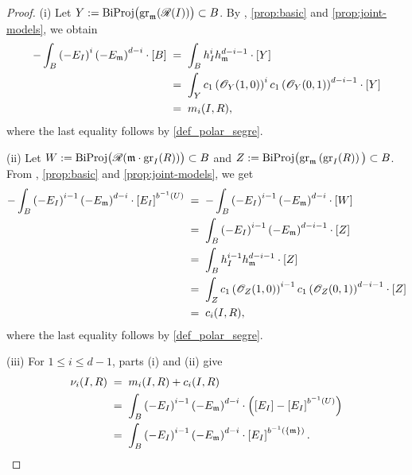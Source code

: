\documentclass[a4paper, 11pt]{amsart}
\newcommand{\mm}{{\normalfont\mathfrak{m}}}
\newcommand{\Rees}{\mathscr{R}}
\newcommand{\OO}{\mathscr{O}}
\newcommand{\gr}{{\normalfont\text{gr}}}
\newcommand{\biProj}{{\normalfont\text{BiProj}}}
\theoremstyle{definition}
\begin{document}
	\begin{proof}
		(i) Let $Y := \biProj\big(\gr_\mm(\Rees(I))\big) \subset B$.
		By \cite[\S 4]{KTBR}, \autoref{prop:basic} and \autoref{prop:joint-models}, we obtain
		\begin{align*}
			-\int_B \left(-E_I\right)^i \left(-E_\mm\right)^{d-i} \cdot \left[B\right] &\;=\; \int_B h_I^i h_\mm^{d-i-1} \cdot \left[Y\right] \\
			&\;=\; \int_Y c_1\left(\OO_Y(1,0)\right)^i c_1\left(\OO_Y(0,1)\right)^{d-i-1} \cdot \left[Y\right] \\
			&\;=\; m_i(I, R),
		\end{align*}
		where the last equality follows by \autoref{def_polar_segre}.
		
		(ii) Let $W := \biProj\big(\Rees(\mm \cdot\gr_I(R))\big) \subset B$ and $Z:=\biProj\big(\gr_\mm\left(\gr_I(R)\right)\big) \subset B$.
		From \cite[\S 4]{KTBR}, \autoref{prop:basic} and \autoref{prop:joint-models}, we get
		\begin{align*}
			-\int_B \left(-E_I\right)^{i-1} \left(-E_\mm\right)^{d-i} \cdot \left[E_I\right]^{b^{-1}(U)}  &\;=\;  -\int_B \left(-E_I\right)^{i-1} \left(-E_\mm\right)^{d-i} \cdot \left[W\right] \\
			&\;=\;  \int_B \left(-E_I\right)^{i-1} \left(-E_\mm\right)^{d-i-1} \cdot \left[Z\right] \\
			&\;=\; \int_B h_I^{i-1}h_\mm^{d-i-1} \cdot \left[Z\right] \\
			&\;=\; \int_Z c_1\left(\OO_Z(1,0)\right)^{i-1} c_1\left(\OO_Z(0,1)\right)^{d-i-1} \cdot \left[Z\right] \\
			&\;=\; c_i(I, R),
		\end{align*}
		where the last equality follows by \autoref{def_polar_segre}.
		
		(iii) For $1\leq i\leq d-1$, parts (i) and (ii) give
		\begin{align*}
			\nu_i(I, R) &\;=\; m_i(I, R) + c_i(I, R) \\
			&\;=\; \int_B \left(-E_I\right)^{i-1} \left(-E_\mm\right)^{d-i} \cdot \left(\left[E_I\right] - \left[E_I\right]^{b^{-1}(U)} \right) \\
			&
			\;=\; \int_B \left(-E_I\right)^{i-1} \left(-E_\mm\right)^{d-i} \cdot \left[E_I\right]^{b^{-1}(\{\mm\})}. 
		\end{align*}
		

\end{proof}
\end{document}
